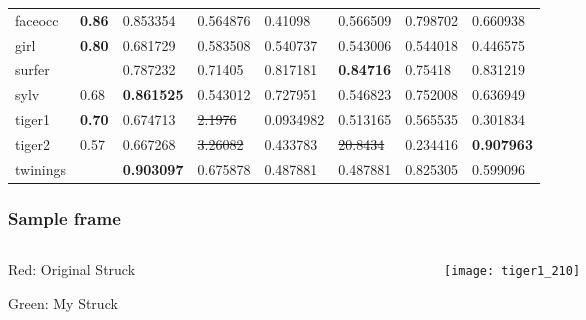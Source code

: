 \begin{frame}
\begin{center}
{\begin{tabular}{l l l l l l l l}
            faceocc          & \textbf{0.86} &         0.853354  &         0.564876  & 0.41098    &         0.566509  & 0.798702  &         0.660938  \\
            girl             & \textbf{0.80} &         0.681729  &         0.583508  & 0.540737   &         0.543006  & 0.544018  &         0.446575  \\
            surfer           &               &         0.787232  &         0.71405   & 0.817181   & \textbf{0.84716}  & 0.75418   &         0.831219  \\
            sylv             &         0.68  & \textbf{0.861525} &         0.543012  & 0.727951   &         0.546823  & 0.752008  &         0.636949  \\
            tiger1           & \textbf{0.70} &         0.674713  &   \sout{2.1976}   & 0.0934982  &         0.513165  & 0.565535  &         0.301834  \\
            tiger2           &         0.57  &         0.667268  &   \sout{3.26082}  & 0.433783   &  \sout{20.8434}   & 0.234416  & \textbf{0.907963} \\
            twinings         &               & \textbf{0.903097} &         0.675878  & 0.487881   &         0.487881  & 0.825305  &         0.599096  \\
            \bottomrule
        \end{tabular}}
    \end{center}
\end{frame}


\begin{frame}
    \frametitle{Sample frame}
    \begin{columns}[t]
        \begin{column}{0.25\textwidth}
            Red: Original Struck

            Green: My Struck
        \end{column}
        \begin{column}{0.75\textwidth}
            \begin{center}
                \texttt{[image: tiger1\_210]}
            \end{center}
        \end{column}
    \end{columns}
\end{frame}

